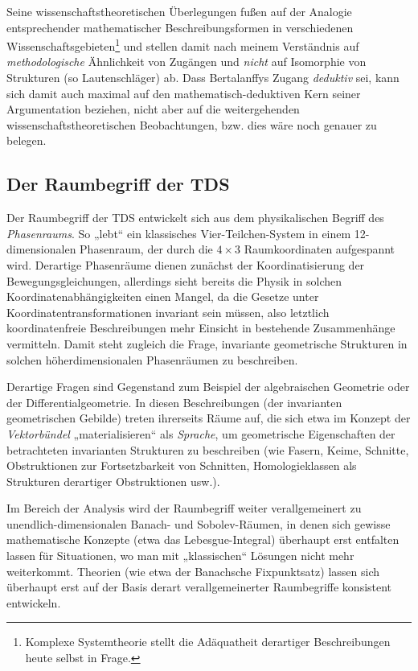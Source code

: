 \documentclass[11pt,a4paper]{article}
\begin{document}
Seine wissenschaftstheoretischen Überlegungen fußen auf der Analogie
entsprechender mathematischer Beschreibungsformen in verschiedenen
Wissenschaftsgebieten\footnote{Komplexe Systemtheorie stellt die Adäquatheit
  derartiger Beschreibungen heute selbst in Frage.} und stellen damit nach
meinem Verständnis auf \emph{methodologische} Ähnlichkeit von Zugängen und
\emph{nicht} auf Isomorphie von Strukturen (so Lautenschläger) ab. Dass
Bertalanffys Zugang \emph{deduktiv} sei, kann sich damit auch maximal auf den
mathematisch-deduktiven Kern seiner Argumentation beziehen, nicht aber auf die
weitergehenden wissenschaftstheoretischen Beobachtungen, bzw. dies wäre noch
genauer zu belegen.

\subsection{Der Raumbegriff der TDS}

Der Raumbegriff der TDS entwickelt sich aus dem physikalischen Begriff des
\emph{Phasenraums}. So „lebt“ ein klassisches Vier-Teilchen-System in einem
12-dimensionalen Phasenraum, der durch die $4\times 3$ Raumkoordinaten
aufgespannt wird. Derartige Phasenräume dienen zunächst der Koordinatisierung
der Bewegungsgleichungen, allerdings sieht bereits die Physik in solchen
Koordinatenabhängigkeiten einen Mangel, da die Gesetze unter
Koordinatentransformationen invariant sein müssen, also letztlich
koordinatenfreie Beschreibungen mehr Einsicht in bestehende Zusammenhänge
vermitteln. Damit steht zugleich die Frage, invariante geometrische Strukturen
in solchen höherdimensionalen Phasenräumen zu beschreiben.

Derartige Fragen sind Gegenstand zum Beispiel der algebraischen Geometrie oder
der Differentialgeometrie. In diesen Beschreibungen (der invarianten
geometrischen Gebilde) treten ihrerseits Räume auf, die sich etwa im Konzept
der \emph{Vektorbündel} „materialisieren“ als \emph{Sprache}, um geometrische
Eigenschaften der betrachteten invarianten Strukturen zu beschreiben (wie
Fasern, Keime, Schnitte, Obstruktionen zur Fortsetzbarkeit von Schnitten,
Homologieklassen als Strukturen derartiger Obstruktionen usw.).

Im Bereich der Analysis wird der Raumbegriff weiter verallgemeinert zu
unendlich-dimensio\-nalen Banach- und Sobolev-Räumen, in denen sich gewisse
mathematische Konzepte (etwa das Lebesgue-Integral) überhaupt erst entfalten
lassen für Situationen, wo man mit „klassischen“ Lösungen nicht mehr
weiterkommt.  Theorien (wie etwa der Banachsche Fixpunktsatz) lassen sich
überhaupt erst auf der Basis derart verallgemeinerter Raumbegriffe konsistent
entwickeln.
\end{document}
